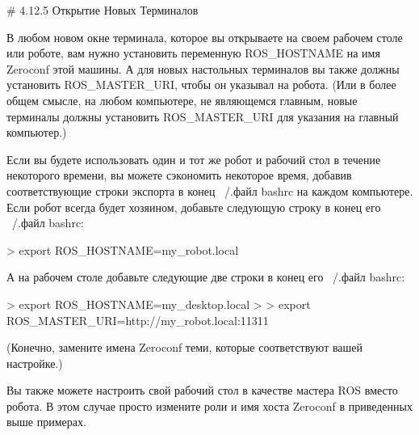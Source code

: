 # 4.12.5 Открытие Новых Терминалов


В любом новом окне терминала, которое вы открываете на своем рабочем столе или роботе, вам нужно установить переменную ROS\_HOSTNAME на имя Zeroconf этой машины. А для новых настольных терминалов вы также должны установить ROS\_MASTER\_URI, чтобы он указывал на робота. (Или в более общем смысле, на любом компьютере, не являющемся главным, новые терминалы должны установить ROS\_MASTER\_URI для указания на главный компьютер.)

Если вы будете использовать один и тот же робот и рабочий стол в течение некоторого времени, вы можете сэкономить некоторое время, добавив соответствующие строки экспорта в конец ~/.файл bashrc на каждом компьютере. Если робот всегда будет хозяином, добавьте следующую строку в конец его ~/.файл bashrc:

> export ROS\_HOSTNAME=my\_robot.local

А на рабочем столе добавьте следующие две строки в конец его ~/.файл bashrc:

> export ROS\_HOSTNAME=my\_desktop.local
>
> export ROS\_MASTER\_URI=http://my\_robot.local:11311

(Конечно, замените имена Zeroconf теми, которые соответствуют вашей настройке.) 

Вы также можете настроить свой рабочий стол в качестве мастера ROS вместо робота. В этом случае просто измените роли и имя хоста Zeroconf в приведенных выше примерах.

